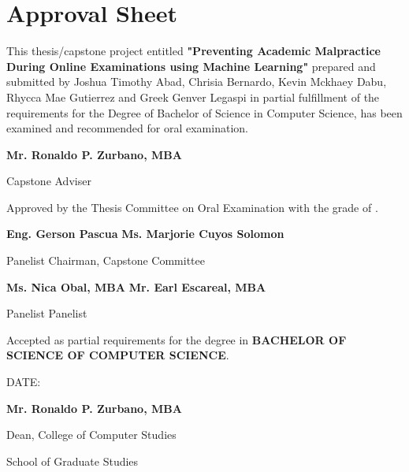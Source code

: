 \section*{\hfill Approval Sheet \hfill}

This thesis/capstone project entitled \textbf{"Preventing Academic Malpractice During Online Examinations using Machine Learning" }prepared and submitted by Joshua Timothy Abad, Chrisia Bernardo, Kevin Mckhaey Dabu, Rhycca Mae Gutierrez and Greek Genver Legaspi in partial fulfillment of the requirements for the Degree of Bachelor of Science in Computer Science, has been examined and recommended for oral examination.

\vspace{2em}

\begin{flushright}
   \textbf{Mr. Ronaldo P. Zurbano, MBA}

   Capstone Adviser
\end{flushright}

\vspace{2em}

\noindent
Approved by the Thesis Committee on Oral Examination with the grade of \makebox[1.0in]{\hrulefill}.

\vspace{2em}

\noindent \textbf{Eng. Gerson Pascua} \hfill \textbf{Ms. Marjorie Cuyos Solomon }

\noindent Panelist \hfill Chairman, Capstone Committee

\vspace{2em}

\noindent \textbf{Ms. Nica Obal, MBA} \hfill \textbf{Mr. Earl Escareal, MBA}

\noindent Panelist \hfill Panelist

\vspace{2em}

\noindent
Accepted as partial requirements for the degree in \textbf{BACHELOR OF SCIENCE OF COMPUTER SCIENCE}.

\noindent
DATE: \makebox[1.0in]{\hrulefill}

\vspace{2em}

\begin{flushright}
   \textbf{Mr. Ronaldo P. Zurbano, MBA}

   Dean, College of Computer Studies

   School of Graduate Studies
\end{flushright}
